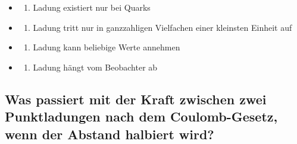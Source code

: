 \documentclass[
  11pt,
]{article}
\providecommand{\tightlist}{%
  \setlength{\itemsep}{0pt}\setlength{\parskip}{0pt}}
\begin{document}
\begin{itemize}
\tightlist
\item
  \begin{enumerate}
  \def\labelenumi{\Alph{enumi})}
  \tightlist
  \item
    Ladung existiert nur bei Quarks\\
  \end{enumerate}
\item
  \begin{enumerate}
  \def\labelenumi{\Alph{enumi})}
  \setcounter{enumi}{1}
  \tightlist
  \item
    Ladung tritt nur in ganzzahligen Vielfachen einer kleinsten Einheit
    auf\\
  \end{enumerate}
\item
  \begin{enumerate}
  \def\labelenumi{\Alph{enumi})}
  \setcounter{enumi}{2}
  \tightlist
  \item
    Ladung kann beliebige Werte annehmen\\
  \end{enumerate}
\item
  \begin{enumerate}
  \def\labelenumi{\Alph{enumi})}
  \setcounter{enumi}{3}
  \tightlist
  \item
    Ladung hängt vom Beobachter ab
  \end{enumerate}
\end{itemize}

\subsection{Was passiert mit der Kraft zwischen zwei Punktladungen nach
dem Coulomb-Gesetz, wenn der Abstand halbiert
wird?}\label{was-passiert-mit-der-kraft-zwischen-zwei-punktladungen-nach-dem-coulomb-gesetz-wenn-der-abstand-halbiert-wird}
\end{document}
